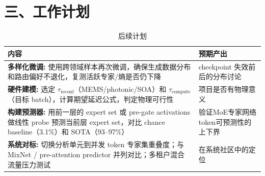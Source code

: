\documentclass{sjtuweekly}
\begin{document}
\section{三、工作计划}

\begin{table}[htbp]
\centering
\small
\begin{tabularx}{\linewidth}{@{}XX@{}}
\toprule
内容 & 预期产出 \\
\midrule
\textbf{多样化微调:} 使用跨领域样本再次微调，确保生成数据分布和路由偏好不退化，复测活跃专家/熵是否仍下降 & checkpoint 失效前后的分布讨论 \\
\textbf{硬件建模:} 选定 $\tau_{\text{reconf}}$（MEMS/photonic/SOA）和 $\tau_{\text{compute}}$（目标 batch），计算期望延迟公式，判定物理可行性 & 项目是否有物理意义 \\
\textbf{构建预测器:} 用前一层的 expert set 或 pre-gate activations 做线性 probe 预测当前层 expert set，对比 chance baseline（3.1\%）和 SOTA（93--97\%） & 验证MoE专家网络token可预测性的上下界 \\
\textbf{系统对标:} 切换分析单元到并发 token 专家集重叠度；与 MixNet / pre-attention predictor 并列对比；多租户混合流量压力测试 & 在系统社区中的定位 \\
\bottomrule
\end{tabularx}

\caption{后续计划}
\label{tab:plan}
\end{table}


\printbib
\end{document}
